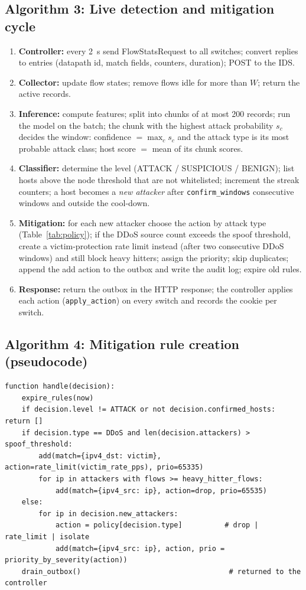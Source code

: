 \subsection{Algorithm 3: Live detection and mitigation cycle}
\begin{enumerate}[label=\arabic*.]
	\item \textbf{Controller:} every 2~s send FlowStatsRequest to all switches; convert replies to entries (datapath id, match fields, counters, duration); POST to the IDS.
	\item \textbf{Collector:} update flow states; remove flows idle for more than $W$; return the active records.
	\item \textbf{Inference:} compute features; split into chunks of at most 200 records; run the model on the batch; the chunk with the highest attack probability $s_c$ decides the window: confidence $=\max_c s_c$ and the attack type is its most probable attack class; host score $=$ mean of its chunk scores.
	\item \textbf{Classifier:} determine the level (ATTACK / SUSPICIOUS / BENIGN); list hosts above the node threshold that are not whitelisted; increment the streak counters; a host becomes a \emph{new attacker} after \texttt{confirm\_windows} consecutive windows and outside the cool-down.
	\item \textbf{Mitigation:} for each new attacker choose the action by attack type (Table~\ref{tab:policy}); if the DDoS source count exceeds the spoof threshold, create a victim-protection rate limit instead (after two consecutive DDoS windows) and still block heavy hitters; assign the priority; skip duplicates; append the add action to the outbox and write the audit log; expire old rules.
	\item \textbf{Response:} return the outbox in the HTTP response; the controller applies each action (\texttt{apply\_action}) on every switch and records the cookie per switch.
\end{enumerate}

\subsection{Algorithm 4: Mitigation rule creation (pseudocode)}
{\footnotesize
\begin{verbatim}
function handle(decision):
    expire_rules(now)
    if decision.level != ATTACK or not decision.confirmed_hosts: return []
    if decision.type == DDoS and len(decision.attackers) > spoof_threshold:
        add(match={ipv4_dst: victim}, action=rate_limit(victim_rate_pps), prio=65335)
        for ip in attackers with flows >= heavy_hitter_flows:
            add(match={ipv4_src: ip}, action=drop, prio=65535)
    else:
        for ip in decision.new_attackers:
            action = policy[decision.type]          # drop | rate_limit | isolate
            add(match={ipv4_src: ip}, action, prio = priority_by_severity(action))
    drain_outbox()                                   # returned to the controller
\end{verbatim}}

